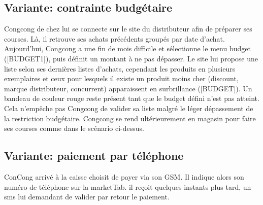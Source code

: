 \subsection{Variante: contrainte budgétaire}
Congcong de chez lui se connecte sur le site du distributeur afin de préparer ses courses.
Là, il retrouve ses achats précédents groupés par date d'achat.
Aujourd'hui, Congcong a une fin de mois difficile et sélectionne le menu budget ([BUDGET1]), puis définit un montant à ne pas dépasser.
Le site lui propose une liste selon ses dernières listes d'achats, cependant les produits en plusieurs exemplaires et ceux pour lesquels il existe un produit moins cher (discount, marque distributeur, concurrent) apparaissent en surbrillance ([BUDGET]).
Un bandeau de couleur rouge reste présent tant que le budget défini n'est pas atteint.
Cela n'empêche pas Congcong de valider sa liste malgré le léger dépassement de la restriction budgétaire.
Congcong se rend ultérieurement en magasin pour faire ses courses comme dans le scénario ci-dessus.

\subsection{Variante: paiement par téléphone}
ConCong arrivé à la caisse choisit de payer via son GSM. 
Il indique alors son numéro de téléphone sur la marketTab. il reçoit quelques instants plus tard, un sms lui demandant de valider par retour le paiement.
